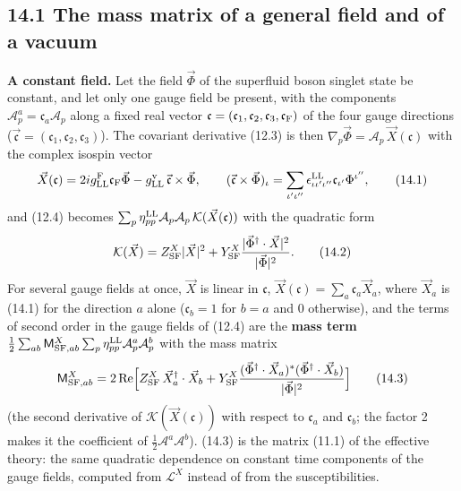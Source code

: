 \documentclass[
  10pt,
]{article}
\begin{document}
\hypertarget{the-mass-matrix-of-a-general-field-and-of-a-vacuum}{%
\subsection{14.1 The mass matrix of a general field and of a
vacuum}\label{the-mass-matrix-of-a-general-field-and-of-a-vacuum}}

\textbf{A constant field.} Let the field \(\vec\Phi\) of the superfluid
boson singlet state be constant, and let only one gauge field be
present, with the components
\(\mathcal A^a_p=\mathfrak c_a\mathcal A_p\) along a fixed real vector
\(\mathfrak c=(\mathfrak c_1,\mathfrak c_2,\mathfrak c_3,\mathfrak c_{\rm F})\)
of the four gauge directions
(\(\vec{\mathfrak c}=(\mathfrak c_1,\mathfrak c_2,\mathfrak c_3)\)). The
covariant derivative (12.3) is then
\(\nabla_p\vec\Phi=\mathcal A_p\,\vec X(\mathfrak c)\) with the complex
isospin vector
\[\vec X(\mathfrak c)=2ig^{\rm F}_{\rm LL}\mathfrak c_{\rm F}\vec\Phi-g^{\rm v}_{\rm LL}\,\vec{\mathfrak c}\times\vec\Phi,\qquad(\vec{\mathfrak c}\times\vec\Phi)_\iota=\sum_{\iota'\iota''}\epsilon^{\rm LL}_{\iota\iota'\iota''}\mathfrak c_{\iota'}\Phi^{\iota''},\tag{14.1}\]
and (12.4) becomes
\(\sum_p\eta^{\rm LL}_{pp}\mathcal A_p\mathcal A_p\,\mathcal K(\vec X(\mathfrak c))\)
with the quadratic form
\[\mathcal K(\vec X)=Z^X_{\rm SF}\lvert\vec X\rvert^2+Y^X_{\rm SF}\frac{\lvert\vec\Phi^\dagger\cdot\vec X\rvert^2}{\lvert\vec\Phi\rvert^2}.\tag{14.2}\]
For several gauge fields at once, \(\vec X\) is linear in
\(\mathfrak c\), \(\vec X(\mathfrak c)=\sum_a\mathfrak c_a\vec X_a\),
where \(\vec X_a\) is (14.1) for the direction \(a\) alone
(\(\mathfrak c_b=1\) for \(b=a\) and 0 otherwise), and the terms of
second order in the gauge fields of (12.4) are the \textbf{mass term}
\(\tfrac12\sum_{ab}\mathsf M^X_{{\rm SF},ab}\sum_p\eta^{\rm LL}_{pp}\mathcal A^a_p\mathcal A^b_p\)
with the mass matrix
\[\mathsf M^X_{{\rm SF},ab}=2\,\mathrm{Re}\Big[Z^X_{\rm SF}\,\vec X_a^\dagger\cdot\vec X_b+Y^X_{\rm SF}\frac{(\vec\Phi^\dagger\cdot\vec X_a)^*(\vec\Phi^\dagger\cdot\vec X_b)}{\lvert\vec\Phi\rvert^2}\Big]\tag{14.3}\]
(the second derivative of \(\mathcal K(\vec X(\mathfrak c))\) with
respect to \(\mathfrak c_a\) and \(\mathfrak c_b\); the factor 2 makes
it the coefficient of \(\tfrac12\mathcal A^a\mathcal A^b\)). (14.3) is
the matrix (11.1) of the effective theory: the same quadratic dependence
on constant time components of the gauge fields, computed from
\(\mathcal L^X\) instead of from the susceptibilities.
\end{document}
